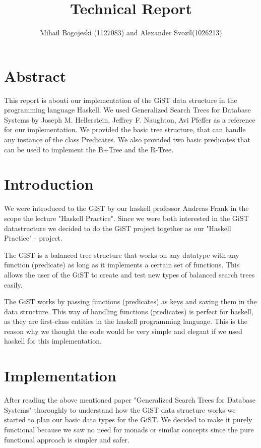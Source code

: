 \documentclass{scrartcl}
\title{Technical Report}
\author{Mihail Bogojeski (1127083) and Alexander Svozil(1026213)}
\date{}
\begin{document}
\maketitle
\tableofcontents
\newpage
 \section {Abstract}
    This report is abouti our implementation of the GiST data structure in the programming language Haskell.
    We used  Generalized Search Trees for Database Systems by Joseph M. Hellerstein, Jeffrey F. Naughton, 
    Avi Pfeffer as a reference for our implementation. We provided the basic tree structure, that can handle any 
    instance of the class Predicates. We also provided two basic predicates that can be used to implement the B+Tree and
    the R-Tree.
\newpage

 \section{Introduction}
 We were introduced to the GiST by our haskell professor Andreas Frank in the scope the lecture "Haskell Practice". 
 Since we were both interested in the GiST datastructure we decided to do the GiST project together as our "Haskell Practice" - project.
 
 The GiST is a balanced tree structure that works on any datatype with any function (predicate) as long as it implements
 a certain set of functions. This allows the user of the GiST to create and test new types of balanced search trees easily.

 The GiST works by passing functions (predicates) as keys and saving them in the data structure.
 This way of handling functions (predicates) is perfect for haskell, as they are first-class entities in the haskell programming language.
 This is the reason why we thought the code would be very simple and elegant if we used haskell for this implementation.

 \section{Implementation}

 After reading the above mentioned paper "Generalized Search Trees for Database Systems" thoroughly to understand how the GiST data structure works we started to plan our basic
 data types for the GiST. We decided to make it purely functional because we saw no need for monads or similar concepts since the pure functional approach is simpler and safer.
 
\end{document}

